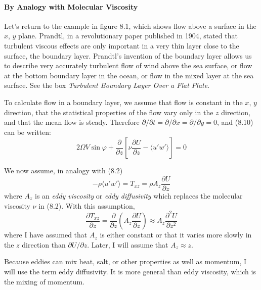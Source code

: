 \paragraph{By Analogy with Molecular Viscosity}
Let's return to the example in figure 8.1, which shows flow above a
surface in the $x$, $y$ plane. Prandtl, in a revolutionary paper
published in 1904, stated that turbulent viscous effects are only
important in a very thin layer close to the surface, the boundary
layer. Prandtl's invention of the boundary layer allows us to describe
very accurately turbulent flow of wind above the sea surface, or flow
at the bottom boundary layer in the ocean, or flow in the mixed
layer at the sea surface. See the box
\textit{Turbulent Boundary Layer Over a Flat Plate}.

To calculate flow in a boundary layer, we assume that flow is constant
in the $x$, $y$ direction, that the statistical properties of the flow
vary only in the $z$ direction, and that the mean flow is
steady. Therefore $\partial /\partial t = \partial /\partial x =
\partial /\partial y = 0$, and (8.10) can be written:
\begin{equation}
2 \Omega V \sin \varphi + \frac{\partial }{\partial z} \left[\nu \frac{\partial
U}{\partial z} - \langle u'w'\rangle \right] = 0
\end{equation}

We now assume, in analogy with (8.2)
\begin{equation}
- \rho \langle u'w'\rangle = T_{xz} = \rho A_z \frac{\partial U}{\partial z}
\end{equation}
where $A_z$ is an \textit{eddy viscosity} or \textit{eddy
  diffusivity} which replaces the
molecular viscosity $\nu$ in (8.2). With this assumption,
\begin{equation} 
\frac{\partial{T_{xz}}}{\partial{z}} =
\frac{\partial}{\partial{z}}\left(A_z\frac{\partial{U}}{\partial{z}}\right)
\approx A_z \frac{\partial^2 U}{\partial z^2}
\end{equation}
where I have assumed that $A_z$ is either constant or that it varies
more slowly in the $z$ direction than $\partial U / \partial z$.
Later, I will assume that $A_z \approx z$.

Because eddies can mix heat, salt, or other properties as well as
momentum, I will use the term eddy diffusivity. It is more general
than eddy viscosity, which is the mixing of
momentum.


